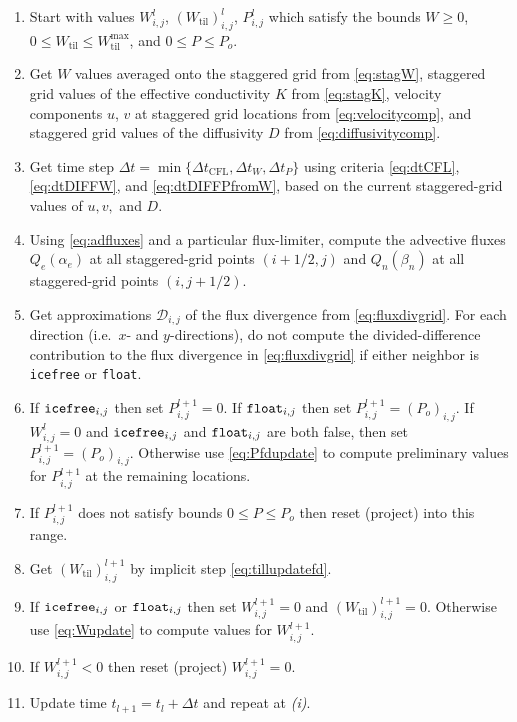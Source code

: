 \documentclass[11pt,final]{amsart}
\newcommand{\Wtil}{W_{\text{til}}}
\newcommand{\Wtilmax}{W_{\text{til}}^{\text{max}}}
\newcommand{\Wlij}{W^l_{i,j}}
\newcommand{\Plij}{P^l_{i,j}}
\begin{document}
\bigskip\medskip
\renewcommand{\labelenumi}{\emph{(\roman{enumi})}}
\begin{enumerate}
\item Start with values $\Wlij$, $(\Wtil)_{i,j}^l$, $\Plij$ which satisfy the bounds $W\ge 0$, $0\le \Wtil \le \Wtilmax$, and $0 \le P \le P_o$.
\item Get $W$ values averaged onto the staggered grid from \eqref{eq:stagW}, staggered grid values of the effective conductivity $K$ from \eqref{eq:stagK}, velocity components $u$, $v$ at staggered grid locations from \eqref{eq:velocitycomp}, and staggered grid values of the diffusivity $D$ from \eqref{eq:diffusivitycomp}.
\item Get time step $\Delta t = \min\{\Delta t_{\text{CFL}}, \Delta t_W, \Delta t_P\}$ using criteria \eqref{eq:dtCFL}, \eqref{eq:dtDIFFW}, and \eqref{eq:dtDIFFPfromW}, based on the current staggered-grid values of $u,v,$ and $D$.
\item Using \eqref{eq:adfluxes} and a particular flux-limiter, compute the advective fluxes $Q_e(\alpha_e)$ at all staggered-grid points $(i+1/2,j)$ and $Q_n(\beta_n)$ at all staggered-grid points $(i,j+1/2)$.
\item Get approximations $\mathcal{D}_{i,j}$ of the flux divergence from \eqref{eq:fluxdivgrid}.  For each direction (i.e.~$x$- and $y$-directions), do not compute the divided-difference contribution to the flux divergence in \eqref{eq:fluxdivgrid} if either neighbor is \texttt{icefree} or \texttt{float}.
\item If $\text{\texttt{icefree}}_{i,j}$ then set $P_{i,j}^{l+1}=0$.  If $\text{\texttt{float}}_{i,j}$ then set $P_{i,j}^{l+1} = (P_o)_{i,j}$.  If $\Wlij=0$ and $\text{\texttt{icefree}}_{i,j}$ and $\text{\texttt{float}}_{i,j}$ are both false, then set $P_{i,j}^{l+1} = (P_o)_{i,j}$.  Otherwise use \eqref{eq:Pfdupdate} to compute preliminary values for $P_{i,j}^{l+1}$ at the remaining locations.
\item If $P_{i,j}^{l+1}$ does not satisfy bounds $0 \le P \le P_o$ then reset (project) into this range.
\item Get $(\Wtil)_{i,j}^{l+1}$ by implicit step \eqref{eq:tillupdatefd}.
\item If $\text{\texttt{icefree}}_{i,j}$ or $\text{\texttt{float}}_{i,j}$ then set $W_{i,j}^{l+1}=0$ and $(\Wtil)_{i,j}^{l+1}=0$.  Otherwise use \eqref{eq:Wupdate} to compute values for $W_{i,j}^{l+1}$.
\item If $W_{i,j}^{l+1}<0$ then reset (project) $W_{i,j}^{l+1}=0$.
\item Update time $t_{l+1}=t_l+\Delta t$ and repeat at \emph{(i)}.
\end{enumerate}
\end{document}
